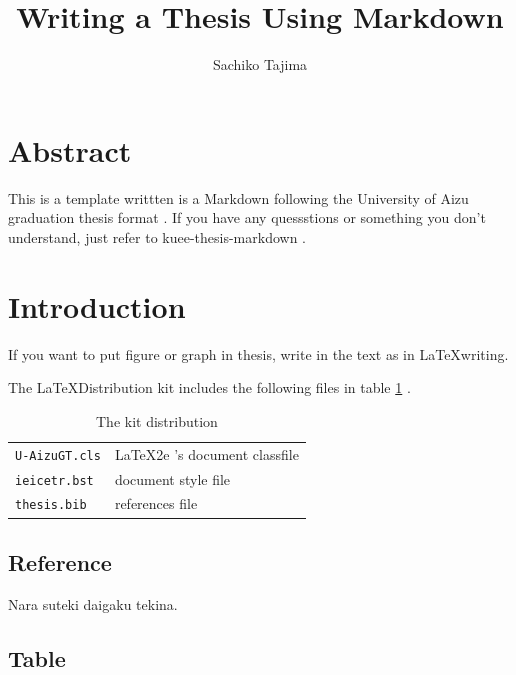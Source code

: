 \documentclass[
  ams,
  uplatex]{U-AizuGT}
\title{Writing a Thesis Using Markdown}
\author{Sachiko Tajima}
\begin{document}
    \maketitle
    
    \hypertarget{abstract}{%
    \section{Abstract}\label{abstract}}
    
    This is a template writtten is a Markdown following the University of
    Aizu graduation thesis format \cite{graduation-thesis}. If you have any
    quessstions or something you don't understand, just refer to
    kuee-thesis-markdown \cite{kuee-thesis-markdown} .
    
    \hypertarget{introduction}{%
    \section{Introduction}\label{introduction}}
    
    If you want to put figure or graph in thesis, write in the text as in
    \LaTeX writing.
    
    The \LaTeX Distribution kit includes the following files in table
    \ref{tab:kit} .
    
    \begin{table}[htbp]
      \caption{The kit distribution}\label{tab:kit}
      \begin{center}
        \begin{tabular}{ll}
          \verb+U-AizuGT.cls+ &  \LaTeX2e{} 's document classfile       \\
          \verb+ieicetr.bst+ & document style file \cite{ieicetr} \\
          \verb+thesis.bib+ & references file              \\
        \end{tabular}
      \end{center}
    \end{table}
    
    \hypertarget{reference}{%
    \subsection{Reference}\label{reference}}
    
    Nara suteki daigaku \cite{nara-nice} tekina.
    
    \hypertarget{table}{%
    \subsection{Table}\label{table}}
    
\end{document}
